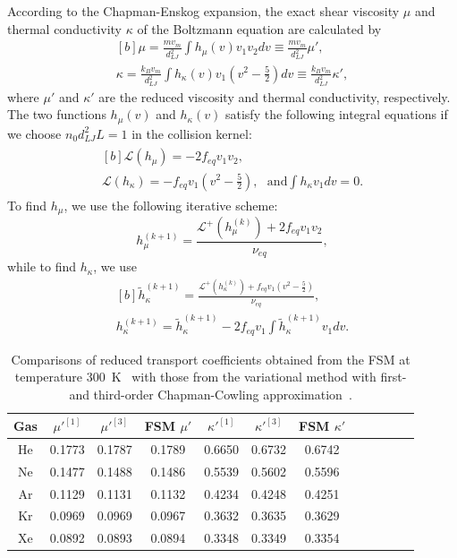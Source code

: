 According to the Chapman-Enskog expansion, the exact shear viscosity $\mu$ and thermal conductivity $\kappa$ of the Boltzmann equation are calculated by
\begin{equation}
\begin{aligned}[b]
\mu=\frac{mv_m}{d_{LJ}^2}\int h_\mu(v)v_1v_2dv\equiv\frac{mv_m}{d_{LJ}^2}\mu',\\
\kappa=\frac{k_Bv_m}{d_{LJ}^2}\int h_\kappa(v)v_1\left(v^2-\frac{5}{2}\right)dv\equiv\frac{k_Bv_m}{d_{LJ}^2}\kappa',
\end{aligned}
\end{equation}
where $\mu'$ and $\kappa'$ are the reduced viscosity and thermal conductivity, respectively. The two functions $h_\mu(v)$ and $h_\kappa(v)$ satisfy the following integral equations if we choose $n_0d_{LJ}^2L=1$ in the collision kernel:
\begin{eqnarray}\label{transport}
\begin{aligned}[b]
\mathcal{L}(h_\mu)=-2f_{eq}v_
1v_2,\\
\mathcal{L}(h_\kappa)=-f_{eq}v_1\left(v^2-\frac{5}{2}\right), \ \ \ \text{and} \int h_\kappa v_1dv=0.
\end{aligned}
\end{eqnarray}
To find $h_\mu$, we use the following iterative scheme:
\begin{equation}\label{iteration_thermal}
h_\mu^{(k+1)}=\frac{\mathcal{L}^+(h_\mu^{(k)})+2f_{eq}v_1v_2}{\nu_{eq}},
\end{equation} 
while to find $h_\kappa$, we use
\begin{equation}\label{iteration_thermal2}
\begin{aligned}[b]
\widetilde{h}_\kappa^{(k+1)}=\frac{\mathcal{L}^+(h_\kappa^{(k)})+f_{eq}v_1\left(v^2-\frac{5}{2}\right)}{\nu_{eq}},\\
{h}_\kappa^{(k+1)}=\widetilde{h}_\kappa^{(k+1)}-2f_{eq}v_1{\int \widetilde{h}_\kappa^{(k+1)} v_1 dv}.
\end{aligned}
\end{equation} 
\begin{table}[t]
	\caption{Comparisons of reduced transport coefficients obtained from the FSM at temperature 300~K~\cite{wuPoF2015} with those from the variational method with first- and third-order Chapman-Cowling approximation~\cite{variational}.   }
	\centering
	\begin{tabular}{cccccccccccc}
		\hline
		Gas & $\mu'^{[1]}$ & $\mu'^{[3]}$ &   FSM  $\mu'$ & $\kappa'^{[1]}$ & $\kappa'^{[3]}$ &  FSM  $\kappa'$ \\ 
		\hline 
		He & 0.1773 & 0.1787  & 0.1789  & 0.6650 & 0.6732  & 0.6742 \\
		Ne & 0.1477 & 0.1488  & 0.1486  & 0.5539 & 0.5602  & 0.5596 \\
		Ar & 0.1129 & 0.1131  & 0.1132  & 0.4234 & 0.4248  & 0.4251 \\
		Kr & 0.0969 & 0.0969  & 0.0967  & 0.3632 & 0.3635  & 0.3629 \\
		Xe & 0.0892 & 0.0893  & 0.0894  & 0.3348 & 0.3349  & 0.3354 \\
		\hline
	\end{tabular}
	\label{transport_coe} 
\end{table}
